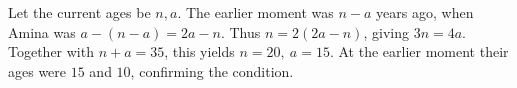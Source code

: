 Let the current ages be $n,a$. The earlier moment was $n-a$ years ago, when Amina was $a-(n-a)=2a-n$. Thus $n=2(2a-n)$, giving $3n=4a$. Together with $n+a=35$, this yields $\boxed{n=20,\ a=15}$. At the earlier moment their ages were $15$ and $10$, confirming the condition.
